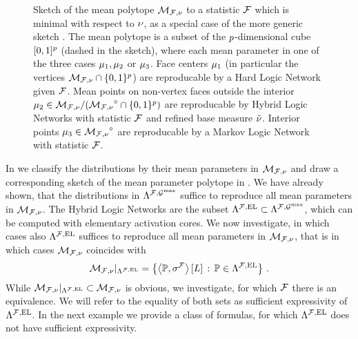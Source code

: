 \begin{figure}[t]
    \begin{center}
        
    \end{center}
    \caption{Sketch of the mean polytope ${\mathcal{M}_{\mathcal{F},\nu}}$ to a statistic $\mathcal{F}$ which is minimal with respect to $\nu$, as a special case of the more generic sketch .
    The mean polytope is a subset of the $p$-dimensional cube $[0,1]^{p}$ (dashed in the sketch), where each mean parameter in one of the three cases $\mu_{1},\mu_{2}$ or $\mu_{3}$.
    \textcolor{\concolor}{Face centers} $\mu_{1}$ (in particular the vertices $\mathcal{M}_{\mathcal{F},\nu}\cap\{0,1\}^{p}$) are reproducable by a Hard Logic Network given $\mathcal{F}$.
    Mean points on non-vertex faces outside the interior $\mu_{2}\in\mathcal{M}_{\mathcal{F},\nu}/({\mathcal{M}_{\mathcal{F},\nu}}^{\circ}\cap\{0,1\}^{p})$ are reproducable by Hybrid Logic Networks with statistic $\mathcal{F}$ and refined base measure $\tilde{\nu}$.
    \textcolor{\probcolor}{Interior points} $\mu_{3}\in{\mathcal{M}_{\mathcal{F},\nu}}^{\circ}$ are reproducable by a Markov Logic Network with statistic $\mathcal{F}$.
    }\label{fig:meansetSketch}
\end{figure}

In  we classify the distributions by their mean parameters in $\mathcal{M}_{\mathcal{F},\nu}$ and draw a corresponding sketch of the mean parameter polytope in .
We have already shown, that the distributions in $\Lambda^{\mathcal{F},\mathcal{G}^{\mathrm{max}}}$ suffice to reproduce all mean parameters in $\mathcal{M}_{\mathcal{F},\nu}$.
The Hybrid Logic Networks are the subset $\Lambda^{\mathcal{F},\mathrm{EL}}\subset\Lambda^{\mathcal{F},\mathcal{G}^{\mathrm{max}}}$, which can be computed with elementary activation cores.
We now investigate, in which cases also $\Lambda^{\mathcal{F},\mathrm{EL}}$ suffices to reproduce all mean parameters in $\mathcal{M}_{\mathcal{F},\nu}$, that is in which cases $\mathcal{M}_{\mathcal{F},\nu}$ coincides with
\begin{align*}
    \mathcal{M}_{\mathcal{F},\nu}|_{\Lambda^{\mathcal{F},\mathrm{EL}}}
    = \left\{ \left\langle \mathbb{P},\sigma^{\mathcal{F}}\right\rangle \left[ L \right] \,:\, \mathbb{P}\in\Lambda^{\mathcal{F},\mathrm{EL}} \right\} \, .
\end{align*}
While $\mathcal{M}_{\mathcal{F},\nu}|_{\Lambda^{\mathcal{F},\mathrm{EL}}}\subset\mathcal{M}_{\mathcal{F},\nu}$ is obvious, we investigate, for which $\mathcal{F}$ there is an equivalence.
We will refer to the equality of both sets as sufficient expressivity of $\Lambda^{\mathcal{F},\mathrm{EL}}$.
In the next example we provide a class of formulas, for which $\Lambda^{\mathcal{F},\mathrm{EL}}$ does not have sufficient expressivity.

